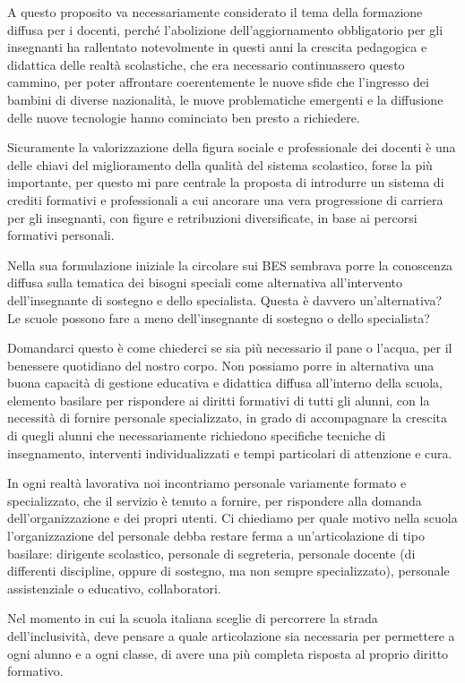 A questo proposito va necessariamente considerato il tema della formazione diffusa per i docenti, perché l'abolizione dell'aggiornamento obbligatorio per gli insegnanti ha rallentato notevolmente in questi anni la crescita pedagogica e didattica delle realtà scolastiche, che era necessario continuassero questo cammino, per poter affrontare coerentemente le nuove sfide che l'ingresso dei bambini di diverse nazionalità, le nuove problematiche emergenti e la diffusione delle nuove tecnologie hanno cominciato ben presto a richiedere.

Sicuramente la valorizzazione della figura sociale e professionale dei docenti è una delle chiavi del miglioramento della qualità del sistema scolastico, forse la più importante, per questo mi pare centrale la proposta di introdurre un sistema di crediti formativi e professionali a cui ancorare una vera progressione di carriera per gli insegnanti, con figure e retribuzioni diversificate, in base ai percorsi formativi personali.

Nella sua formulazione iniziale la circolare sui BES sembrava porre la conoscenza diffusa sulla tematica dei bisogni speciali come alternativa all'intervento dell'insegnante di sostegno e dello specialista. Questa è davvero un'alternativa? Le scuole possono fare a meno dell'insegnante di sostegno o dello specialista?

Domandarci questo è come chiederci se sia più necessario il pane o l'acqua, per il benessere quotidiano del nostro corpo. Non possiamo porre in alternativa una buona capacità di gestione educativa e didattica diffusa all'interno della scuola, elemento basilare per rispondere ai diritti formativi di tutti gli alunni, con la necessità di fornire personale specializzato, in grado di accompagnare la crescita di quegli alunni che necessariamente richiedono specifiche tecniche di insegnamento, interventi individualizzati e tempi particolari di attenzione e cura.

In ogni realtà lavorativa noi incontriamo personale variamente formato e specializzato, che il servizio è tenuto a fornire, per rispondere alla domanda dell'organizzazione e dei propri utenti. Ci chiediamo per quale motivo nella scuola l'organizzazione del personale debba restare ferma a un'articolazione di tipo basilare: dirigente scolastico, personale di segreteria, personale docente (di differenti discipline, oppure di sostegno, ma non sempre specializzato), personale assistenziale o educativo, collaboratori.

Nel momento in cui la scuola italiana sceglie di percorrere la strada dell'inclusività, deve pensare a quale articolazione sia necessaria per permettere a ogni alunno e a ogni classe, di avere una più completa risposta al proprio diritto formativo.

